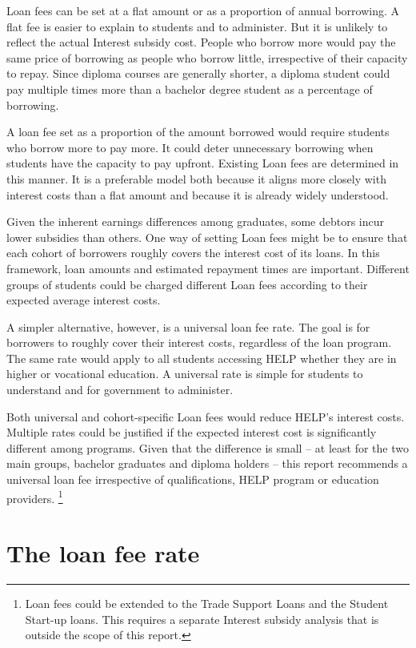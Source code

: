 \documentclass[embargoed]{grattan}
\begin{document}
\Gls{Loan fees} can be set at a flat amount or as a proportion of annual borrowing.
A flat fee is easier to explain to students and to administer.
But it is unlikely to reflect the actual \gls{Interest subsidy} cost.
People who borrow more would pay the same price of borrowing as people who borrow little, irrespective of their capacity to repay.
Since diploma courses are generally shorter, a diploma student could pay multiple times more than a bachelor degree student as a percentage of borrowing.

A loan fee set as a proportion of the amount borrowed would require students who borrow more to pay more.
It could deter unnecessary borrowing when students have the capacity to pay upfront.
Existing \gls{Loan fees} are determined in this manner.
It is a preferable model both because it aligns more closely with interest costs than a flat amount and because it is already widely understood.

Given the inherent earnings differences among graduates, some debtors incur lower subsidies than others.
One way of setting \gls{Loan fees} might be to ensure that each cohort of borrowers roughly covers the interest cost of its loans.
In this framework, loan amounts and estimated repayment times are important.
Different groups of students could be charged different \gls{Loan fees} according to their expected average interest costs.

A simpler alternative, however, is a universal loan fee rate.
The goal is for borrowers to roughly cover their interest costs, regardless of the loan program.
The same rate would apply to all students accessing \gls{HELP} whether they are in higher or vocational education.
A universal rate is simple for students to understand and for government to administer.

Both universal and cohort-specific \gls{Loan fees} would reduce \gls{HELP}'s interest costs.
Multiple rates could be justified if the expected interest cost is significantly different among programs.
Given that the difference is small -- at least for the two main groups, bachelor graduates and diploma holders -- this report recommends a universal loan fee irrespective of qualifications, \gls{HELP} program or education providers.%
\footnote{\Gls{Loan fees} could be extended to the Trade Support Loans and the Student Start-up loans.
This requires a separate \gls{Interest subsidy} analysis that is outside the scope of this report.}

\section{The loan fee rate}\label{sec:the-loan-fee-rate}
\end{document}
